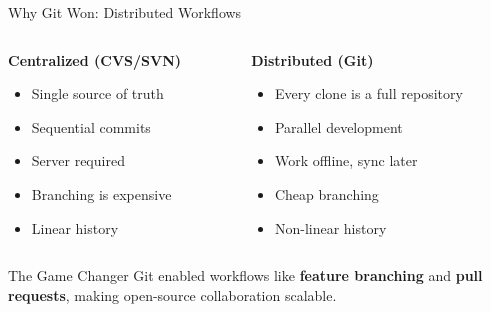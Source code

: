 \documentclass{beamer}
\begin{document}
\begin{frame}{Why Git Won: Distributed Workflows}
\begin{columns}
    \begin{column}{0.5\textwidth}
        \textbf{Centralized (CVS/SVN)}
        \begin{itemize}
            \item Single source of truth
            \item Sequential commits
            \item Server required 
            \item Branching is expensive
            \item Linear history
        \end{itemize}
    \end{column}
    \begin{column}{0.5\textwidth}
        \textbf{Distributed (Git)}
        \begin{itemize}
            \item Every clone is a full repository
            \item Parallel development
            \item Work offline, sync later
            \item Cheap branching
            \item Non-linear history
        \end{itemize}
    \end{column}
\end{columns}

\begin{block}{The Game Changer}
Git enabled workflows like \textbf{feature branching} and \textbf{pull requests}, making open-source collaboration scalable.
\end{block}
\end{frame}
\end{document}
